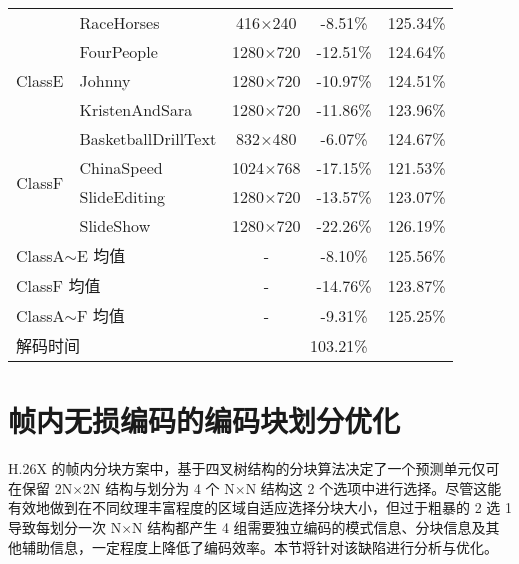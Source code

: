 \begin{table}[!p]
\begin{tabular}{@{}clccc@{}}
                                               & RaceHorses                   & 416$\times$240   & -8.51\%  & 125.34\% \\
        \multirow{3}{*}{ClassE}                & FourPeople                   & 1280$\times$720  & -12.51\% & 124.64\% \\
                                               & Johnny                       & 1280$\times$720  & -10.97\% & 124.51\% \\
                                               & KristenAndSara               & 1280$\times$720  & -11.86\% & 123.96\% \\
        \multirow{4}{*}{ClassF}                & BasketballDrillText          & 832$\times$480   & -6.07\%  & 124.67\% \\
                                               & ChinaSpeed                   & 1024$\times$768  & -17.15\% & 121.53\% \\
                                               & SlideEditing                 & 1280$\times$720  & -13.57\% & 123.07\% \\
                                               & SlideShow                    & 1280$\times$720  & -22.26\% & 126.19\% \\ \midrule
        \multicolumn{2}{l}{ClassA$\sim$E 均值} & -                            & -8.10\%          & 125.56\%            \\ \midrule
        \multicolumn{2}{l}{ClassF 均值}        & -                            & -14.76\%         & 123.87\%            \\ \midrule
        \multicolumn{2}{l}{ClassA$\sim$F 均值} & -                            & -9.31\%          & 125.25\%            \\ \midrule
        \multicolumn{2}{l}{解码时间}           & \multicolumn{3}{c}{103.21\%}                                          \\ \bottomrule
    \end{tabular}
\end{table}

\section{帧内无损编码的编码块划分优化}
\label{cha:L-BPSec}
H.26X 的帧内分块方案中，基于四叉树结构的分块算法决定了一个预测单元仅可在保留 2N$\times$2N 结构与划分为 4 个 N$\times$N 结构这 2 个选项中进行选择。尽管这能有效地做到在不同纹理丰富程度的区域自适应选择分块大小，但过于粗暴的 2 选 1 导致每划分一次 N$\times$N 结构都产生 4 组需要独立编码的模式信息、分块信息及其他辅助信息，一定程度上降低了编码效率。本节将针对该缺陷进行分析与优化。

